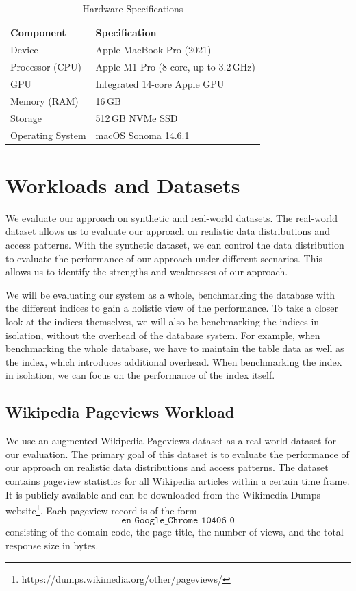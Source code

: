 \begin{table}[htbp]
\centering
\caption{Hardware Specifications}
\label{tab:hardware-specs}
\begin{tabular}{ll}
\toprule
\textbf{Component} & \textbf{Specification} \\ 
\midrule
Device & Apple MacBook Pro (2021) \\
Processor (CPU) & Apple M1 Pro (8-core, up to 3.2\,GHz) \\
GPU & Integrated 14-core Apple GPU \\
Memory (RAM) & 16\,GB \\
Storage & 512\,GB NVMe SSD \\
Operating System & macOS Sonoma 14.6.1 \\
\bottomrule
\end{tabular}
\end{table}

\section{Workloads and Datasets}
We evaluate our approach on synthetic and real-world datasets.
The real-world dataset allows us to evaluate our approach on realistic data distributions and access patterns.
With the synthetic dataset, we can control the data distribution to evaluate the performance of our approach under different scenarios.
This allows us to identify the strengths and weaknesses of our approach.

We will be evaluating our system as a whole, benchmarking the database with the different indices to gain a holistic view of the performance.
To take a closer look at the indices themselves, we will also be benchmarking the indices in isolation, without the overhead of the database system.
For example, when benchmarking the whole database, we have to maintain the table data as well as the index, which introduces additional overhead.
When benchmarking the index in isolation, we can focus on the performance of the index itself.

\subsection*{Wikipedia Pageviews Workload}
We use an augmented Wikipedia Pageviews dataset \cite{wiki_pageviews} as a real-world dataset for our evaluation.
The primary goal of this dataset is to evaluate the performance of our approach on realistic data distributions and access patterns.
The dataset contains pageview statistics for all Wikipedia articles within a certain time frame.
It is publicly available and can be downloaded from the Wikimedia Dumps website\footnote{https://dumps.wikimedia.org/other/pageviews/}.
Each pageview record is of the form 
$$
\texttt{en Google\_Chrome 10406 0}
$$
consisting of the domain code, the page title, the number of views, and  the total response size in bytes.

